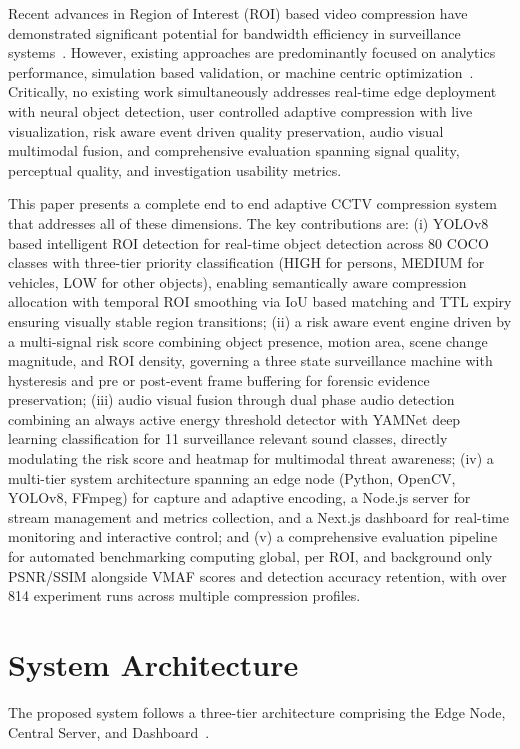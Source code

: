 \documentclass[11pt,a4paper]{article}
\begin{document}
Recent advances in Region of Interest (ROI) based video compression have demonstrated significant potential for bandwidth efficiency in surveillance systems~\cite{wang2025compression,li2024region}. However, existing approaches are predominantly focused on analytics performance, simulation based validation, or machine centric optimization~\cite{guo2023deepstream,labiod2023region}. Critically, no existing work simultaneously addresses real-time edge deployment with neural object detection, user controlled adaptive compression with live visualization, risk aware event driven quality preservation, audio visual multimodal fusion, and comprehensive evaluation spanning signal quality, perceptual quality, and investigation usability metrics.

This paper presents a complete end to end adaptive CCTV compression system that addresses all of these dimensions. The key contributions are: (i) YOLOv8 based intelligent ROI detection for real-time object detection across 80 COCO classes with three-tier priority classification (HIGH for persons, MEDIUM for vehicles, LOW for other objects), enabling semantically aware compression allocation with temporal ROI smoothing via IoU based matching and TTL expiry ensuring visually stable region transitions; (ii) a risk aware event engine driven by a multi-signal risk score combining object presence, motion area, scene change magnitude, and ROI density, governing a three state surveillance machine with hysteresis and pre or post-event frame buffering for forensic evidence preservation; (iii) audio visual fusion through dual phase audio detection combining an always active energy threshold detector with YAMNet deep learning classification for 11 surveillance relevant sound classes, directly modulating the risk score and heatmap for multimodal threat awareness; (iv) a multi-tier system architecture spanning an edge node (Python, OpenCV, YOLOv8, FFmpeg) for capture and adaptive encoding, a Node.js server for stream management and metrics collection, and a Next.js dashboard for real-time monitoring and interactive control; and (v) a comprehensive evaluation pipeline for automated benchmarking computing global, per ROI, and background only PSNR/SSIM alongside VMAF scores and detection accuracy retention, with over 814 experiment runs across multiple compression profiles.

\section{System Architecture}
The proposed system follows a three-tier architecture comprising the Edge Node, Central Server, and Dashboard~\cite{liu2025edge}.
\end{document}
